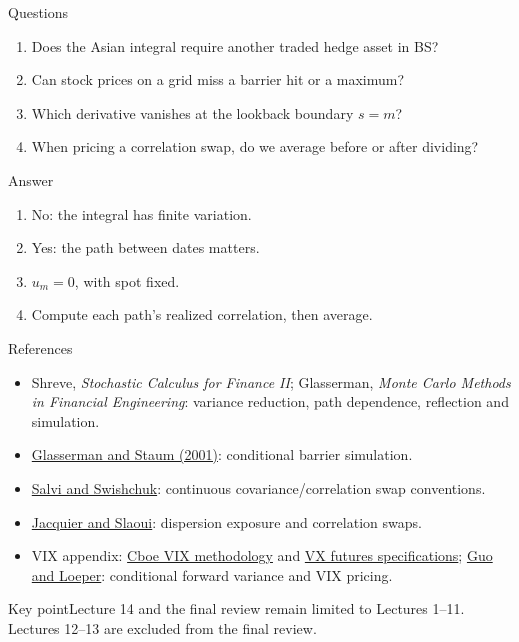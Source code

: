 \documentclass[handout,10pt,t,aspectratio=169]{beamer}
\newenvironment{answerbox}{\begin{exampleblock}{Answer}}{\end{exampleblock}}
\newenvironment{keybox}{\begin{exampleblock}{Key point}}{\end{exampleblock}}
\begin{document}
\begin{frame}{Questions}
\small
\begin{enumerate}
\item Does the Asian integral require another traded hedge asset in BS?
\item Can stock prices on a grid miss a barrier hit or a maximum?
\item Which derivative vanishes at the lookback boundary \(s=m\)?
\item When pricing a correlation swap, do we average before or after dividing?
\end{enumerate}
\begin{answerbox}
\begin{enumerate}
\item No: the integral has finite variation.
\item Yes: the path between dates matters.
\item \(u_m=0\), with spot fixed.
\item Compute each path's realized correlation, then average.
\end{enumerate}
\end{answerbox}
\end{frame}

\begin{frame}{References}
\small
\begin{itemize}
\item Shreve, \emph{Stochastic Calculus for Finance II}; Glasserman,
\emph{Monte Carlo Methods in Financial Engineering}: variance reduction, path dependence,
reflection and simulation.
\item \href{https://business.columbia.edu/sites/default/files-efs/pubfiles/4311/one-step_survival.pdf}
{Glasserman and Staum (2001)}: conditional barrier simulation.
\item \href{https://arxiv.org/abs/1205.5565}{Salvi and Swishchuk}:
continuous covariance/correlation swap conventions.
\item \href{https://arxiv.org/abs/1004.0125}{Jacquier and Slaoui}:
dispersion exposure and correlation swaps.
\item VIX appendix: \href{https://cdn.cboe.com/resources/vix/VIX_Methodology.pdf}{Cboe VIX methodology}
and \href{https://www.cboe.com/tradable-products/vix/vix-futures/specifications/}
{VX futures specifications}; \href{https://arxiv.org/abs/1611.00464}{Guo and Loeper}:
conditional forward variance and VIX pricing.
\end{itemize}
\begin{keybox}Lecture 14 and the final review remain limited to Lectures 1--11.
Lectures 12--13 are excluded from the final review.
\end{keybox}
\end{frame}
\end{document}
